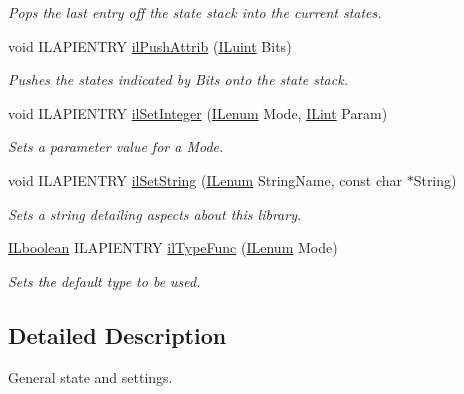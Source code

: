 \begin{DoxyCompactItemize}
\begin{DoxyCompactList}\small\item\em Pops the last entry off the state stack into the current states. \end{DoxyCompactList}\item 
void I\+L\+A\+P\+I\+E\+N\+T\+R\+Y \hyperlink{group__state_ga72e0879c71f59f06c35d2e2a10191fa8}{il\+Push\+Attrib} (\hyperlink{group__il__types_gaff8e86a1072c8d7cfe387fb87c6ed8e1}{I\+Luint} Bits)
\begin{DoxyCompactList}\small\item\em Pushes the states indicated by Bits onto the state stack. \end{DoxyCompactList}\item 
void I\+L\+A\+P\+I\+E\+N\+T\+R\+Y \hyperlink{group__state_ga74a39ec8faa5aa005e918a7049985ef6}{il\+Set\+Integer} (\hyperlink{group__il__types_ga62ca73445716183ef42b1f3906a45ed0}{I\+Lenum} Mode, \hyperlink{group__il__types_ga8effe51a00daaa0878631e5af75a36cb}{I\+Lint} Param)
\begin{DoxyCompactList}\small\item\em Sets a parameter value for a {\itshape Mode}. \end{DoxyCompactList}\item 
void I\+L\+A\+P\+I\+E\+N\+T\+R\+Y \hyperlink{group__state_ga9a4eb898282d4a5cdecc6303bca20814}{il\+Set\+String} (\hyperlink{group__il__types_ga62ca73445716183ef42b1f3906a45ed0}{I\+Lenum} String\+Name, const char $\ast$String)
\begin{DoxyCompactList}\small\item\em Sets a string detailing aspects about this library. \end{DoxyCompactList}\item 
\hypertarget{group__state_ga7ab67de503e1fad00d984167aee02fa9}{\hyperlink{group__il__types_gaa6aa7c95cfdc06b4d8601ef832b7bb0a}{I\+Lboolean} I\+L\+A\+P\+I\+E\+N\+T\+R\+Y \hyperlink{group__state_ga7ab67de503e1fad00d984167aee02fa9}{il\+Type\+Func} (\hyperlink{group__il__types_ga62ca73445716183ef42b1f3906a45ed0}{I\+Lenum} Mode)}\label{group__state_ga7ab67de503e1fad00d984167aee02fa9}

\begin{DoxyCompactList}\small\item\em Sets the default type to be used. \end{DoxyCompactList}\end{DoxyCompactItemize}


\subsection{Detailed Description}
General state and settings. 



